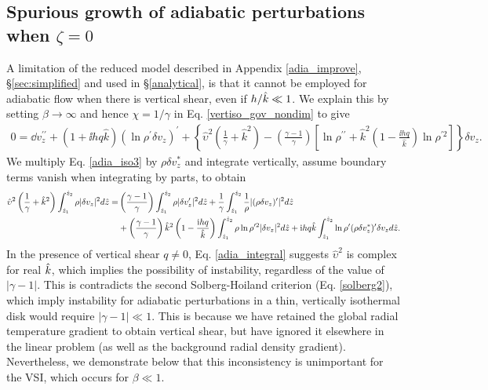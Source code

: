 \subsection{Spurious growth of adiabatic perturbations when
  $\zeta=0$}\label{analytic_adia}  
A limitation of the reduced model described in Appendix
\ref{adia_improve}, \S\ref{sec:simplified} and used in \S\ref{analytical}, is that it
cannot be employed for adiabatic flow when there is vertical shear, even
if $h/\hat{k}\ll1$.  We explain this by setting  $\beta\to\infty$ and hence $\chi = 1/\gamma$ in 
Eq. \ref{vertiso_gov_nondim} %
to give 
\begin{align}
  0 =\dd v_z^{\prime\prime} + \left(1 + \ii h q
    \hat{k}\right)\left(\ln\rho^{\prime}\delta v_z\right)^\prime
  +\left\{\hat{\upsilon}^2\left(\frac{1}{\gamma}+\hat{k}^2\right) 
    -\left(\frac{\gamma-1}{\gamma}\right)\left[\ln\rho^{\prime\prime}+\hat{k}^2\left(1-\frac{\ii h  
          q}{\hat{k}}\right)\ln\rho^{\prime 2}\right]\right\}\delta v_z.\label{adia_iso3}
\end{align}
We multiply Eq. \ref{adia_iso3} by $\rho\delta v_z^*$ and
integrate vertically, assume boundary terms vanish when integrating by
parts, to obtain
\begin{align}
  \hat{\upsilon}^2\left(\frac{1}{\gamma} +
    \hat{k}^2\right)\int_{\hat{z}_1}^{\hat{z}_2}\rho|\delta
  v_z|^2 d\hat{z} 
  =&  \left(\frac{\gamma-1}{\gamma}\right)
  \int_{\hat{z}_1}^{\hat{z}_2}\rho|\delta v_z^\prime|^2 d\hat{z}
  +\frac{1}{\gamma}\int_{\hat{z}_1}^{\hat{z}_2}\frac{1}{\rho}|(\rho\delta
  v_z)^\prime|^2 d\hat{z}\notag\\
&+
  \left(\frac{\gamma-1}{\gamma}\right)\hat{k}^2\left(1-\frac{\mathrm{i} h
      q}{\hat{k}}\right) \int_{\hat{z}_1}^{\hat{z}_2}\rho\ln\rho^{\prime
    2}|\delta v_z|^2 d\hat{z}
+ \mathrm{i} h q \hat{k}
  \int_{\hat{z}_1}^{\hat{z}_2}\ln\rho^\prime(\rho\delta v_z^*)^\prime
  \delta v_z d\hat{z}.\label{adia_integral}
\end{align}
In the presence of vertical shear $q\neq0$, Eq. \ref{adia_integral}
suggests $\hat{\upsilon}^2$ is complex for real $\hat{k}$, which implies the
possibility of instability, regardless of the value of
$|\gamma-1|$. This is contradicts the second Solberg-Hoiland criterion 
(Eq. \ref{solberg2}), which imply instability for adiabatic
perturbations in a thin, vertically isothermal disk would require 
$|\gamma-1|\ll1$. 
This is because we have retained the global radial temperature 
gradient to obtain vertical shear, 
but have ignored it elsewhere in the linear problem (as well as the
background radial density gradient). Nevertheless, we demonstrate below
that this inconsistency is unimportant for the VSI, which occurs 
for $\beta\ll1$.   %

